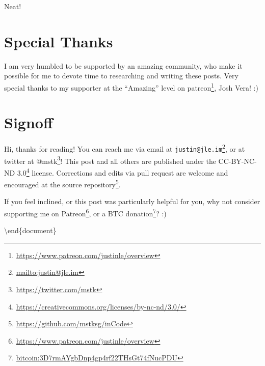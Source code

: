 \documentclass[]{article}
\renewcommand{\href}[2]{#2\footnote{\url{#1}}}
\begin{document}
Neat!

\section{Special Thanks}\label{special-thanks}

I am very humbled to be supported by an amazing community, who make it possible
for me to devote time to researching and writing these posts. Very special
thanks to my supporter at the ``Amazing'' level on
\href{https://www.patreon.com/justinle/overview}{patreon}, Josh Vera! :)

\section{Signoff}\label{signoff}

Hi, thanks for reading! You can reach me via email at
\href{mailto:justin@jle.im}{\nolinkurl{justin@jle.im}}, or at twitter at
\href{https://twitter.com/mstk}{@mstk}! This post and all others are published
under the \href{https://creativecommons.org/licenses/by-nc-nd/3.0/}{CC-BY-NC-ND
3.0} license. Corrections and edits via pull request are welcome and encouraged
at \href{https://github.com/mstksg/inCode}{the source repository}.

If you feel inclined, or this post was particularly helpful for you, why not
consider \href{https://www.patreon.com/justinle/overview}{supporting me on
Patreon}, or a \href{bitcoin:3D7rmAYgbDnp4gp4rf22THsGt74fNucPDU}{BTC donation}?
:)

\textbackslash end\{document\}
\end{document}
